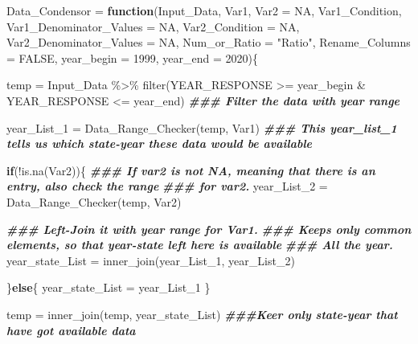 \documentclass[
]{article}
\newenvironment{Shaded}{\begin{snugshade}}{\end{snugshade}}
\newcommand{\AttributeTok}[1]{\textcolor[rgb]{0.77,0.63,0.00}{#1}}
\newcommand{\ConstantTok}[1]{\textcolor[rgb]{0.00,0.00,0.00}{#1}}
\newcommand{\ControlFlowTok}[1]{\textcolor[rgb]{0.13,0.29,0.53}{\textbf{#1}}}
\newcommand{\DecValTok}[1]{\textcolor[rgb]{0.00,0.00,0.81}{#1}}
\newcommand{\DocumentationTok}[1]{\textcolor[rgb]{0.56,0.35,0.01}{\textbf{\textit{#1}}}}
\newcommand{\FunctionTok}[1]{\textcolor[rgb]{0.00,0.00,0.00}{#1}}
\newcommand{\NormalTok}[1]{#1}
\newcommand{\OtherTok}[1]{\textcolor[rgb]{0.56,0.35,0.01}{#1}}
\newcommand{\SpecialCharTok}[1]{\textcolor[rgb]{0.00,0.00,0.00}{#1}}
\newcommand{\StringTok}[1]{\textcolor[rgb]{0.31,0.60,0.02}{#1}}
\begin{document}
\begin{Shaded}
\begin{Highlighting}[]
\NormalTok{Data\_Condensor }\OtherTok{=} \ControlFlowTok{function}\NormalTok{(Input\_Data, Var1, }\AttributeTok{Var2 =} \ConstantTok{NA}\NormalTok{,}
\NormalTok{                          Var1\_Condition, }\AttributeTok{Var1\_Denominator\_Values =} \ConstantTok{NA}\NormalTok{,}
                          \AttributeTok{Var2\_Condition =} \ConstantTok{NA}\NormalTok{, }\AttributeTok{Var2\_Denominator\_Values =} \ConstantTok{NA}\NormalTok{,}
                          \AttributeTok{Num\_or\_Ratio =} \StringTok{"Ratio"}\NormalTok{, }\AttributeTok{Rename\_Columns =} \ConstantTok{FALSE}\NormalTok{,}
                          \AttributeTok{year\_begin =} \DecValTok{1999}\NormalTok{, }\AttributeTok{year\_end =} \DecValTok{2020}\NormalTok{)\{}

  
\NormalTok{  temp }\OtherTok{=}\NormalTok{ Input\_Data }\SpecialCharTok{\%\textgreater{}\%}
    \FunctionTok{filter}\NormalTok{(YEAR\_RESPONSE }\SpecialCharTok{\textgreater{}=}\NormalTok{ year\_begin }\SpecialCharTok{\&}\NormalTok{ YEAR\_RESPONSE }\SpecialCharTok{\textless{}=}\NormalTok{ year\_end)}
  \DocumentationTok{\#\#\# Filter the data with year range}
  
\NormalTok{  year\_List\_1 }\OtherTok{=} \FunctionTok{Data\_Range\_Checker}\NormalTok{(temp, Var1)}
  \DocumentationTok{\#\#\# This year\_list\_1 tells us which state{-}year these data would be available}
  
  \ControlFlowTok{if}\NormalTok{(}\SpecialCharTok{!}\FunctionTok{is.na}\NormalTok{(Var2))\{}
    \DocumentationTok{\#\#\# If var2 is not NA, meaning that there is an entry, also check the range}
    \DocumentationTok{\#\#\# for var2.}
\NormalTok{    year\_List\_2 }\OtherTok{=} \FunctionTok{Data\_Range\_Checker}\NormalTok{(temp, Var2)}
    
    \DocumentationTok{\#\#\# Left{-}Join it with year range for Var1. }
    \DocumentationTok{\#\#\# Keeps only common elements, so that year{-}state left here is available}
    \DocumentationTok{\#\#\# All the year.}
\NormalTok{    year\_state\_List }\OtherTok{=} \FunctionTok{inner\_join}\NormalTok{(year\_List\_1, year\_List\_2)}
    
\NormalTok{  \}}\ControlFlowTok{else}\NormalTok{\{}
\NormalTok{    year\_state\_List }\OtherTok{=}\NormalTok{ year\_List\_1}
\NormalTok{  \}}
  
\NormalTok{  temp }\OtherTok{=} \FunctionTok{inner\_join}\NormalTok{(temp, year\_state\_List)}
  \DocumentationTok{\#\#\#Keer only state{-}year that have got available data}
  

\end{Highlighting}
\end{Shaded}
\end{document}
